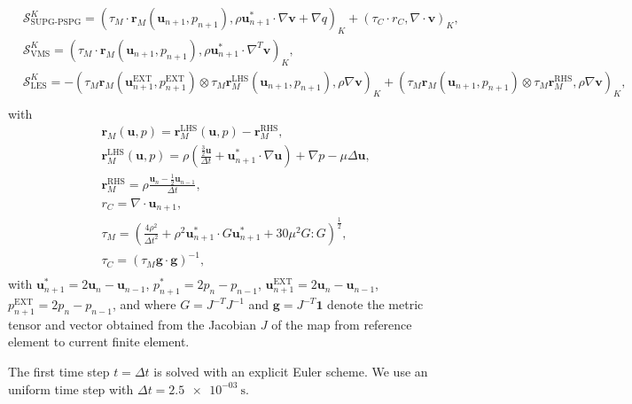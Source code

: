 \begin{problem}
\begin{subequations}
\begin{align*}
    &\mathcal{S}_{\text{SUPG-PSPG}}^K=(\tau_M\cdot \mathbf{r}_M(\mathbf{u}_{n+1}, p_{n+1}),\rho \mathbf{u}_{n+1}^{*}\cdot\nabla\mathbf{v}+\nabla q)_K+(\tau_C\cdot r_C,\nabla\cdot\mathbf{v})_K,\\
    &\mathcal{S}^K_{\text{VMS}} = (\tau_M\cdot \mathbf{r}_M(\mathbf{u}_{n+1}, p_{n+1}),\rho \mathbf{u}_{n+1}^{*}\cdot\nabla^T\mathbf{v})_K,\\
    &\mathcal{S}^K_{\text{LES}} = -(\tau_M \mathbf{r}_M(\mathbf{u}^{\text{EXT}}_{n+1}, p^{\text{EXT}}_{n+1})\otimes\tau_M \mathbf{r}^{\text{LHS}}_M(\mathbf{u}_{n+1}, p_{n+1}),\rho\nabla\mathbf{v})_K+(\tau_M \mathbf{r}_M(\mathbf{u}_{n+1}, p_{n+1})\otimes \tau_M \mathbf{r}^{\text{RHS}}_M, \rho\nabla\mathbf{v})_K,\\
      \end{align*}\end{subequations}
    with
\begin{subequations}\begin{align*}    
    &\mathbf{r}_M(\mathbf{u}, p) = \mathbf{r}^{\text{LHS}}_M(\mathbf{u}, p)-\mathbf{r}^{\text{RHS}}_M,\\
    &\mathbf{r}^{\text{LHS}}_M(\mathbf{u}, p) =\rho\left(\frac{\tfrac{3}{2}\mathbf{u}}{\Delta t}+\mathbf{u}^{*}_{n+1}\cdot\nabla\mathbf{u}\right)+\nabla p-\mu\Delta\mathbf{u},\\
    &\mathbf{r}^{\text{RHS}}_M=\rho\frac{\mathbf{u}_{n}-\tfrac{1}{2}\mathbf{u}_{n-1}}{\Delta t},\\
    &r_C = \nabla\cdot\mathbf{u}_{n+1},\\
    &\tau_M = \left(\frac{4\rho^2}{\Delta t^2}+\rho^2\mathbf{u}^{*}_{n+1}\cdot G\mathbf{u}^{*}_{n+1}+30\mu^2 G:G\right)^{\tfrac{1}{2}},\\
    &\tau_C = (\tau_M\mathbf{g}\cdot\mathbf{g})^{-1},\\
  \end{align*}\end{subequations}
  with $\mathbf{u}^{*}_{n+1} = 2\mathbf{u}_{n}-\mathbf{u}_{n-1}$, $p^{*}_{n+1}=2p_{n}-p_{n-1}$, $\mathbf{u}^{\text{EXT}}_{n+1}=2\mathbf{u}_{n}-\mathbf{u}_{n-1}$,$p^{\text{EXT}}_{n+1}=2p_{n}-p_{n-1}$, and where $G=J^{-T}J^{-1}$ and $\mathbf{g}=J^{-T}\mathbf{1}$ denote the metric tensor and vector obtained from the Jacobian $J$ of the map from reference element to current finite element.
\end{problem}
The first time step $t=\Delta t$ is solved with an explicit Euler scheme. We use an uniform time step with $\Delta t=\SI{2.5e-03}{\second}$.

